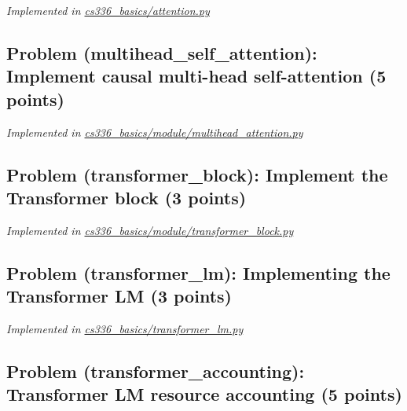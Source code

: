 \documentclass[letterpaper]{article}
\begin{document}
\textit{Implemented in  \href{https://github.com/echung32/ece405-assignment1-basics/blob/main/cs336_basics/attention.py}{cs336\_basics/attention.py}}

\subsection{Problem (multihead\_self\_attention): Implement causal multi-head self-attention (5 points)}

\textit{Implemented in \href{https://github.com/echung32/ece405-assignment1-basics/blob/main/cs336_basics/module/multihead_attention.py}{cs336\_basics/module/multihead\_attention.py}}

\subsection{Problem (transformer\_block): Implement the Transformer block (3 points)}

\textit{Implemented in  \href{https://github.com/echung32/ece405-assignment1-basics/blob/main/cs336_basics/module/transformer_block.py}{cs336\_basics/module/transformer\_block.py}}

\subsection{Problem (transformer\_lm): Implementing the Transformer LM (3 points)}

\textit{Implemented in  \href{https://github.com/echung32/ece405-assignment1-basics/blob/main/cs336_basics/transformer_lm.py}{cs336\_basics/transformer\_lm.py}}

\subsection{Problem (transformer\_accounting): Transformer LM resource accounting (5 points)}
\end{document}
